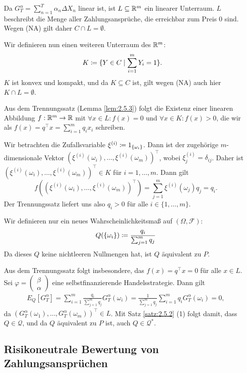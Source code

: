 \documentclass[a4paper,twoside,DIV15,BCOR12mm]{scrbook}
\newcommand{\cF}{\mathcal F}
\newcommand{\cQ}{\mathcal Q}
\begin{document}
\begin{beweis}
Da $G_T^\alpha = \sum_{n=1}^T \alpha_n \Delta X_n$ linear ist, ist $L\subseteq\mathbb{R}^m$ ein linearer Unterraum. $L$ beschreibt die Menge aller Zahlungsansprüche, die erreichbar zum Preis 0 sind. Wegen (NA) gilt daher $C\cap L =\emptyset$.

Wir definieren nun einen weiteren Unterraum des $\mathbb{R}^m$:
\begin{align*}
K &\da \{Y\in C \mid  \sum_{i=1}^m Y_i = 1\}.
\end{align*}
$K$ ist konvex und kompakt, und da $K\subseteq C$ ist, gilt wegen (NA) auch hier $K\cap L=\emptyset$.

Aus dem Trennungssatz (Lemma \ref{lem:2.5.3}) folgt die Existenz einer linearen Abbildung $f:\mathbb{R}^m\to \mathbb{R}$ mit $\forall x\in L: f(x)=0$ und $\forall x\in K: f(x) >0$, die wir als $f(x) = q^\top x = \sum_{i=1}^m q_i x_i$ schreiben.

Wir betrachten die Zufallsvariable $\xi^{(i)} \da 1_{\{\omega_i\}}$. Dann ist der zugehörige $m$-dimensionale Vektor $(\xi^{(i)}(\omega_i),\ldots,\xi^{(i)}(\omega_m))^\top$, wobei $\xi_j^{(i)} = \delta_{ij}$. Daher ist  $(\xi^{(i)}(\omega_i),\ldots,\xi^{(i)}(\omega_m))^\top\in K$ für $i=1,\ldots,m$. Dann gilt 
\[
f((\xi^{(i)}(\omega_i),\ldots,\xi^{(i)}(\omega_m))^\top) = \sum_{j=1}^m \xi^{(i)}(\omega_j)q_j = q_i.
\]
Der Trennungssatz liefert uns also $q_i>0$ für alle $i\in\{1,\ldots,m\}$.

Wir definieren nur ein neues Wahrscheinlichkeitsmaß auf $(\Omega, \cF)$:
\[
Q(\{\omega_i\}) \da \frac{q_i}{\sum_{j=1}^m q_j}
\]
Da dieses $Q$ keine nichtleeren Nullmengen hat, ist $Q$ äquivalent zu $P$.

Aus dem Trennungssatz folgt insbesondere, das $f(x)=q^\top x=0$ für alle $x\in L$. Sei 
$\varphi=\left(\begin{smallmatrix} \beta \\ \alpha \end{smallmatrix}\right)$
eine selbstfinanzierende Handelsstrategie. Dann gilt 
\begin{align*}
E_Q[G_T^\alpha] = \sum_{i=1}^m \frac{q_i}{\sum_{j=1}^m q_j} G_T^\alpha(\omega_i) = \frac{1}{\sum_{j=1}^m q_j} \sum_{i=1}^m q_i G_T^\alpha(\omega_i) = 0,
\end{align*}
da $(G_T^\alpha(\omega_1),\ldots,G_T^\alpha(\omega_m))^\top\in L$. Mit Satz \ref{satz:2.5.2} (1) folgt damit, dass $Q\in \cQ$, und da $Q$ äquivalent zu $P$ ist, auch $Q\in \cQ^*$.
\end{beweis}

\subsection{Risikoneutrale Bewertung von Zahlungsansprüchen}
\end{document}
